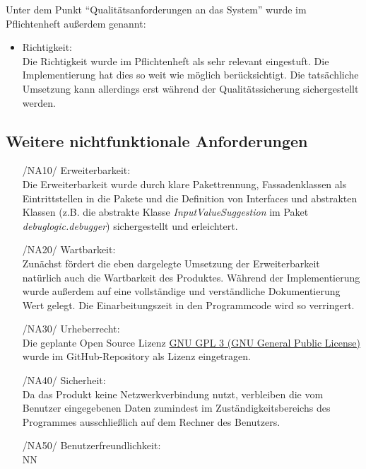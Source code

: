 \documentclass[parskip=full]{scrartcl}
\begin{document}
		Unter dem Punkt \enquote{Qualitätsanforderungen an das System} wurde im Pflichtenheft außerdem genannt:
		\begin{itemize}
		\item Richtigkeit: \\
		Die Richtigkeit wurde im Pflichtenheft als sehr relevant eingestuft. Die Implementierung hat dies so weit wie möglich berücksichtigt. Die tatsächliche Umsetzung kann allerdings erst während der Qualitätssicherung sichergestellt werden.
		\end{itemize}
		
		\subsection{Weitere nichtfunktionale Anforderungen}
		\begin{itemize}
		\item[/NA10/]Erweiterbarkeit: \\
		Die Erweiterbarkeit wurde durch klare Pakettrennung, Fassadenklassen als Eintrittstellen in die Pakete und die Definition von Interfaces und abstrakten Klassen (z.B. die abstrakte Klasse \textit{InputValueSuggestion} im Paket \textit{debuglogic.debugger}) sichergestellt und erleichtert.
		\item[/NA20/]Wartbarkeit: \\
		Zunächst fördert die eben dargelegte Umsetzung der Erweiterbarkeit natürlich auch die Wartbarkeit des Produktes. Während der Implementierung wurde außerdem auf eine vollständige und verständliche Dokumentierung Wert gelegt. Die Einarbeitungszeit in den Programmcode wird so verringert.
		\item[/NA30/]Urheberrecht: \\
		Die geplante Open Source Lizenz \href{https://www.gnu.org/licenses/gpl-3.0.de.html}{GNU GPL 3 (GNU General Public License)} wurde im GitHub-Repository als Lizenz eingetragen.
		
		\item[/NA40/] Sicherheit: \\
		Da das Produkt keine Netzwerkverbindung nutzt, verbleiben die vom Benutzer eingegebenen Daten zumindest im Zuständigkeitsbereichs des Programmes ausschließlich auf dem Rechner des Benutzers.
		\item[/NA50/]Benutzerfreundlichkeit: \\ NN
		\end{itemize}
		
\end{document}
